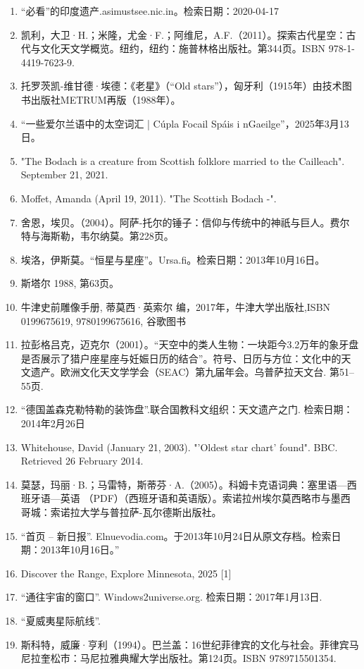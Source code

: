 \begin{enumerate}
\item “必看”的印度遗产.asimustsee.nic.in。检索日期：2020-04-17
\item 凯利，大卫·H.；米隆，尤金·F.；阿维尼，A.F.（2011）。探索古代星空：古代与文化天文学概览。纽约，纽约：施普林格出版社。第344页。ISBN 978-1-4419-7623-9.
\item 托罗茨凯-维甘德·埃德：《老星》（“Old stars”），匈牙利（1915年）由技术图书出版社METRUM再版（1988年）。
\item “一些爱尔兰语中的太空词汇 | Cúpla Focail Spáis i nGaeilge”，2025年3月13日。
\item "The Bodach is a creature from Scottish folklore married to the Cailleach". September 21, 2021.
\item Moffet, Amanda (April 19, 2011). "The Scottish Bodach -".
\item 舍恩，埃贝。（2004）。阿萨-托尔的锤子：信仰与传统中的神祇与巨人。费尔特与海斯勒，韦尔纳莫。第228页。
\item 埃洛，伊斯莫。“恒星与星座”。Ursa.fi。检索日期：2013年10月16日。
\item 斯塔尔 1988, 第63页。
\item 牛津史前雕像手册, 蒂莫西·英索尔 编，2017年，牛津大学出版社,ISBN 0199675619, 9780199675616, 谷歌图书
\item 拉彭格吕克，迈克尔（2001）。“天空中的类人生物：一块距今3.2万年的象牙盘是否展示了猎户座星座与妊娠日历的结合”。符号、日历与方位：文化中的天文遗产。欧洲文化天文学学会（SEAC）第九届年会。乌普萨拉天文台. 第51–55页.
\item “德国盖森克勒特勒的装饰盘”.联合国教科文组织：天文遗产之门. 检索日期：2014年2月26日
\item Whitehouse, David (January 21, 2003). "'Oldest star chart' found". BBC. Retrieved 26 February 2014.
\item 莫瑟，玛丽·B.；马雷特，斯蒂芬·A.（2005）。科姆卡克语词典：塞里语—西班牙语—英语 （PDF）（西班牙语和英语版）。索诺拉州埃尔莫西略市与墨西哥城：索诺拉大学与普拉萨-瓦尔德斯出版社。
\item “首页 – 新日报”. Elnuevodia.com。于2013年10月24日从原文存档。检索日期：2013年10月16日。”
\item  Discover the Range, Explore Minnesota, 2025 [1]
\item “通往宇宙的窗口”. Windows2universe.org. 检索日期：2017年1月13日.
\item “夏威夷星际航线”.
\item 斯科特，威廉·亨利（1994）。巴兰盖：16世纪菲律宾的文化与社会。菲律宾马尼拉奎松市：马尼拉雅典耀大学出版社。第124页。ISBN 9789715501354.

\end{enumerate}
